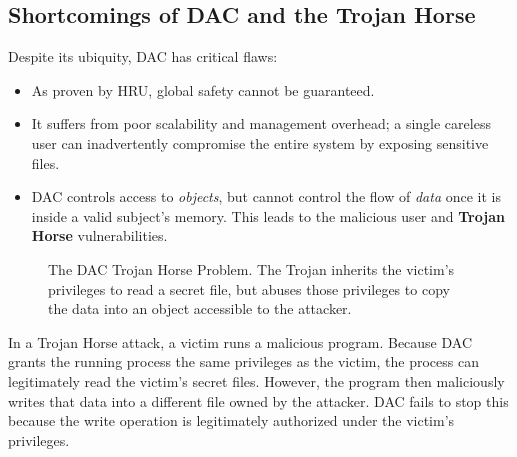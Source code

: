 \subsection{Shortcomings of DAC and the Trojan Horse}
Despite its ubiquity, DAC has critical flaws:
\begin{itemize}
    \item As proven by HRU, global safety cannot be guaranteed.
    \item It suffers from poor scalability and management overhead; a single careless user can inadvertently compromise the entire system by exposing sensitive files.
    \item DAC controls access to \textit{objects}, but cannot control the flow of \textit{data} once it is inside a valid subject's memory. This leads to the malicious user and \textbf{Trojan Horse} vulnerabilities.
\end{itemize}

\begin{figure}[htpb]
    \centering
    \caption{The DAC Trojan Horse Problem. The Trojan inherits the victim's privileges to read a secret file, but abuses those privileges to copy the data into an object accessible to the attacker.}
    \label{fig:trojan_horse}
\end{figure}

In a Trojan Horse attack, a victim runs a malicious program. Because DAC grants the running process the same privileges as the victim, the process can legitimately read the victim's secret files. However, the program then maliciously writes that data into a different file owned by the attacker. DAC fails to stop this because the write operation is legitimately authorized under the victim's privileges.

